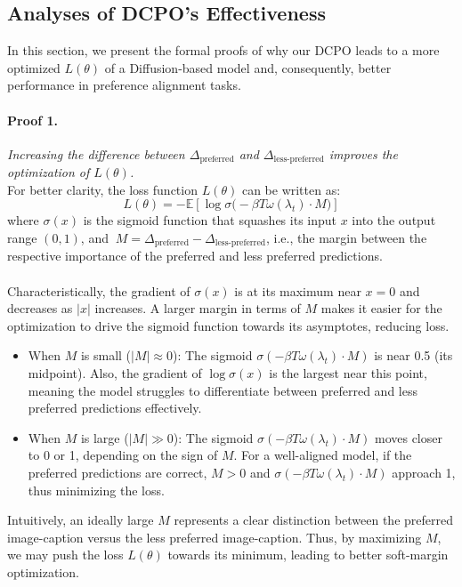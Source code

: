 \subsection{Analyses of DCPO's Effectiveness}
In this section, we present the formal proofs of why our DCPO leads to a more optimized $L(\theta)$ of a Diffusion-based model and, consequently, better performance in preference alignment tasks.

\paragraph{Proof 1.} \textit{Increasing the difference between $\Delta_{\text{preferred}}$ and $ \Delta_{\text{less-preferred}}$ improves the optimization of $L(\theta)$.}
\\
For better clarity, the loss function $L(\theta)$ can be written as:
$$
L(\theta) = -\mathbb{E} \left[ \log \sigma \big( -\beta T \omega(\lambda_t) \cdot M \big) \right]
$$
where $\sigma(x) $ is the sigmoid function that squashes its input $x$ into the output range $ (0, 1) $, and $\ M = \Delta_{\text{preferred}} - \Delta_{\text{less-preferred}} $, i.e., the margin between the respective importance of the preferred and less preferred predictions. 
\\
\\
Characteristically, the gradient of $ \sigma(x) $ is at its maximum near $ x = 0 $ and decreases as $ |x| $ increases. 
A larger margin in terms of $M$ makes it easier for the optimization to drive the sigmoid function towards its asymptotes, reducing loss.

\begin{itemize}
    \item When $ M $ is small ($ |M| \approx 0 $): The sigmoid $ \sigma(-\beta T \omega(\lambda_t) \cdot M) $ is near 0.5 (its midpoint). Also, the gradient of $ \log \sigma(x) $ is the largest near this point, meaning the model struggles to differentiate between preferred and less preferred predictions effectively.

    \item When $ M $ is large ($ |M| \gg 0 $): The sigmoid $ \sigma(-\beta T \omega(\lambda_t) \cdot M) $ moves closer to 0 or 1, depending on the sign of $ M $. For a well-aligned model, if the preferred predictions are correct, $ M > 0 $ and $ \sigma(-\beta T \omega(\lambda_t) \cdot M) $ approach 1, thus minimizing the loss.
    
\end{itemize}
Intuitively, an ideally large $ M $ represents a clear distinction between the preferred image-caption versus the less preferred image-caption. Thus, by maximizing $ M $, we may push the loss $ L(\theta) $ towards its minimum, leading to better soft-margin optimization. 
\\
\\
